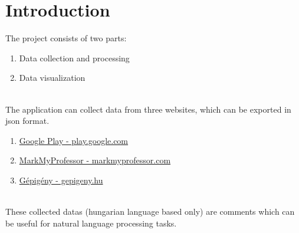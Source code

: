 \section{Introduction}
The project consists of two parts:
\begin{enumerate}
    \item Data collection and processing
    \item Data visualization
\end{enumerate}

\noindent \\
The application can collect data from three websites, which can be exported in json format.
\begin{enumerate}
    \item \href{play.google.com}{Google Play - play.google.com}
    \item \href{markmyprofessor.com}{MarkMyProfessor - markmyprofessor.com}
    \item \href{gepigeny.hu}{Gépigény - gepigeny.hu}
\end{enumerate}

\noindent \\
These collected datas (hungarian language based only) are comments which can be useful for natural language processing tasks.